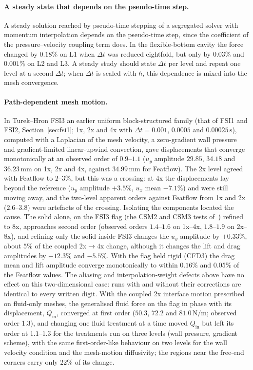 \paragraph{A steady state that depends on the pseudo-time step.}
A steady solution reached by pseudo-time stepping of a segregated solver with momentum interpolation depends on the pseudo-time step, since the coefficient of the pressure--velocity coupling term does.
In the flexible-bottom cavity the force changed by $0.18\%$ on L1 when $\Delta t$ was reduced eightfold, but only by $0.03\%$ and $0.001\%$ on L2 and L3.
A steady study should state $\Delta t$ per level and repeat one level at a second $\Delta t$; when $\Delta t$ is scaled with $h$, this dependence is mixed into the mesh convergence.

\paragraph{Path-dependent mesh motion.}
In Turek--Hron FSI3 an earlier uniform block-structured family (that of FSI1 and FSI2, Section~\ref{sec:fsi1}; 1x, 2x and 4x with $\Delta t = 0.001$, $0.0005$ and $0.00025\,\mathrm{s}$), computed with a Laplacian of the mesh velocity, a zero-gradient wall pressure and gradient-limited linear-upwind convection, gave displacements that converge monotonically at an observed order of $0.9$--$1.1$ ($u_y$ amplitude $29.85$, $34.18$ and $36.23\,\mathrm{mm}$ on 1x, 2x and 4x, against $34.99\,\mathrm{mm}$ for Featflow).
The 2x level agreed with Featflow to $2$--$3\%$, but this was a crossing: at 4x the displacements lay beyond the reference ($u_y$ amplitude $+3.5\%$, $u_x$ mean $-7.1\%$) and were still moving away, and the two-level apparent orders against Featflow from 1x and 2x ($2.6$--$3.8$) were artefacts of the crossing.
Isolating the components located the cause.
The solid alone, on the FSI3 flag (the CSM2 and CSM3 tests of~\citet{Turek2006}) refined to 8x, approaches second order (observed orders $1.4$--$1.6$ on 1x--4x, $1.8$--$1.9$ on 2x--8x), and refining only the solid inside FSI3 changes the $u_y$ amplitude by $+0.33\%$, about $5\%$ of the coupled 2x$\to$4x change, although it changes the lift and drag amplitudes by $-12.3\%$ and $-5.5\%$.
With the flag held rigid (CFD3) the drag mean and lift amplitude converge monotonically to within $0.16\%$ and $0.05\%$ of the Featflow values.
The aliasing and interpolation-weight defects above have no effect on this two-dimensional case: runs with and without their corrections are identical to every written digit.
With the coupled 2x interface motion prescribed on fluid-only meshes, the generalised fluid force on the flag in phase with its displacement, $Q_\mathrm{in}$, converged at first order ($50.3$, $72.2$ and $81.0\,\mathrm{N/m}$; observed order 1.3), and changing one fluid treatment at a time moved $Q_\mathrm{in}$ but left its order at $1.1$--$1.3$ for the treatments run on three levels (wall pressure, gradient scheme), with the same first-order-like behaviour on two levels for the wall velocity condition and the mesh-motion diffusivity; the regions near the free-end corners carry only $22\%$ of its change.
